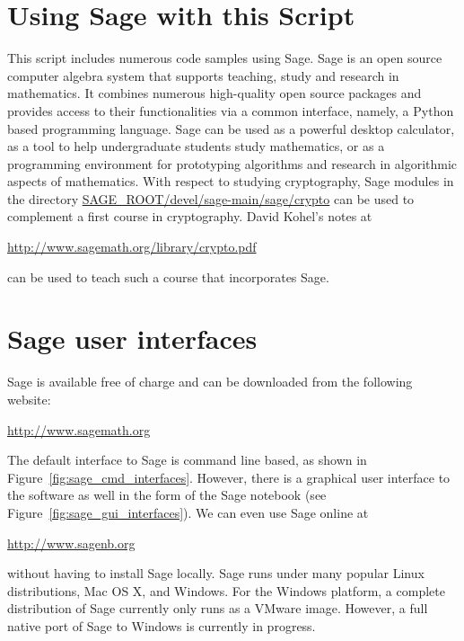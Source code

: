 \hypertarget{appendix-using-sage}{}
\section{Using Sage with this Script}
\label{s:appendix-using-sage}

This script includes numerous code samples using Sage. Sage is an open
source computer algebra system that supports teaching, study and
research in mathematics.  It combines numerous high-quality open
source packages and provides access to their functionalities via a
common interface, namely, a Python based programming language.  Sage
can be used as a powerful desktop calculator, as a tool to help
undergraduate students study mathematics, or as a programming
environment for prototyping algorithms and research in algorithmic
aspects of mathematics.  With respect to studying cryptography, Sage
modules in the directory  \url{SAGE_ROOT/devel/sage-main/sage/crypto}
can be used to complement a first course in cryptography.  David
Kohel's notes at
\begin{center}
  \url{http://www.sagemath.org/library/crypto.pdf}
\end{center}
can be used to teach such a course that incorporates Sage.


\section*{Sage user interfaces}

Sage is available free of charge and can be downloaded from the
following website:
\begin{center}
  \url{http://www.sagemath.org} \\
\end{center}
The default interface to Sage is command line based, as shown in
Figure~\ref{fig:sage_cmd_interfaces}. However, there is a
graphical user interface to the software as well in the form of the
Sage notebook (see Figure~\ref{fig:sage_gui_interfaces}). We can even
use Sage online at
\begin{center}
\url{http://www.sagenb.org}
\end{center}
without having to install Sage locally. Sage runs under many popular
Linux distributions, Mac OS X, and Windows. For the Windows platform,
a complete distribution of Sage currently only runs as a VMware
image. However, a full native port of Sage to Windows is currently in
progress.

